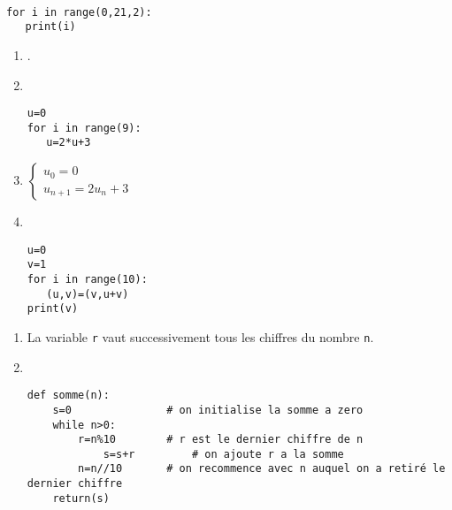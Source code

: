  \begin{solution}~\\
 \vspace{-1cm}
 \begin{verbatim}
for i in range(0,21,2):
   print(i)
\end{verbatim}
\end{solution}
\bigskip


\begin{solution}
\begin{enumerate}
\item .
\item ~\\
\vspace{-0.7cm} \begin{verbatim}
u=0
for i in range(9):
   u=2*u+3
\end{verbatim}
\item 
$\left\lbrace\begin{array}{l}
u_0=0\\
u_{n+1}=2u_n+3
\end{array}\right.$
\item ~\\
\vspace{-0.7cm}
\begin{verbatim}
u=0
v=1
for i in range(10):
   (u,v)=(v,u+v)
print(v)	
\end{verbatim}
\end{enumerate}
\end{solution}
\bigskip


\begin{solution}
\begin{enumerate}
\item La variable \verb?r? vaut successivement tous les chiffres du nombre \verb?n?.
\item ~\\
\vspace{-0.7cm} \begin{verbatim}
def somme(n):
	s=0               # on initialise la somme a zero
	while n>0:
		r=n%10        # r est le dernier chiffre de n
    		s=s+r         # on ajoute r a la somme        
		n=n//10       # on recommence avec n auquel on a retiré le dernier chiffre
	return(s)			
\end{verbatim}
\end{enumerate}
\end{solution}


